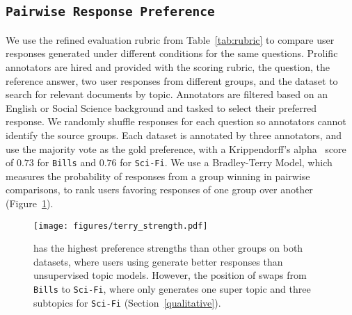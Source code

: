 \subsection{\texttt{Pairwise Response Preference}}
We use the refined evaluation rubric from Table~\ref{tab:rubric} to
compare user responses generated under different conditions for the
same questions.
%
Prolific annotators are hired and provided with the scoring rubric,
the question, the reference answer, two user responses from different
groups, and the dataset to search for relevant documents by topic.
%
Annotators are filtered based on an English or Social Science
background and tasked to select their preferred response.
%
We randomly shuffle responses for each question so annotators cannot
identify the source groups.
%
%
Each dataset is annotated by three annotators, and use the majority
vote as the gold preference, with a Krippendorff's
alpha~\cite{castro-2017-fast-krippendorff} score of \(0.73\) for \texttt{Bills}
and \(0.76\) for \texttt{Sci-Fi}.
%
We use a Bradley-Terry Model, which measures the probability of responses from a group winning in pairwise comparisons, to rank users favoring responses of one group over another
(Figure~\ref{fig:bradely_terry}).

\begin{figure}[t]
    \centering
    \texttt{[image: figures/terry\_strength.pdf]}
    \caption{\bass{} has the highest preference strengths than other groups on both datasets, where users using \bass{} generate better responses than unsupervised topic models. However, the position of \topicgpt{} swaps from \texttt{Bills} to \texttt{Sci-Fi}, where \topicgpt{} only generates one super topic and three subtopics for \texttt{Sci-Fi} (Section~\ref{qualitative}).}
    \label{fig:bradely_terry}
\end{figure}

